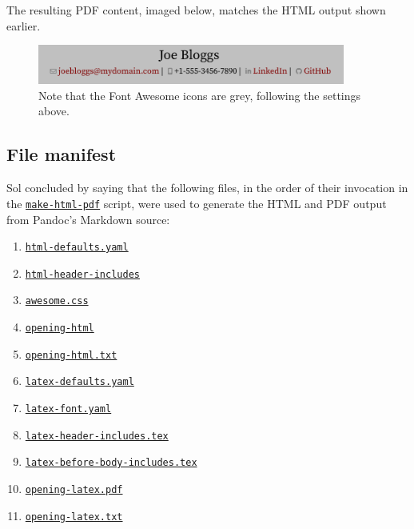 \documentclass[
  british,
  a4paper,
  rgb,
  dvipsnames,
  svgnames,
  hyphens]{article}
\providecommand{\tightlist}{%
  \setlength{\itemsep}{0pt}\setlength{\parskip}{0pt}}
\begin{document}
The resulting PDF content, imaged below, matches the HTML output shown
earlier.

\begin{figure}
\centering
\includegraphics[width=0.9\textwidth,height=\textheight]{images/opening-pdf.png}
\caption{Note that the Font Awesome icons are grey, following the
settings above.}
\end{figure}

\hypertarget{file-manifest}{%
\subsection{File manifest}\label{file-manifest}}

Sol concluded by saying that the following files, in the order of their
invocation in the \href{auxiliary/make-html-pdf}{\texttt{make-html-pdf}}
script, were used to generate the HTML and PDF output from Pandoc's
Markdown source:

\begin{enumerate}
\tightlist
\item
  \href{auxiliary/html-defaults.yaml}{\texttt{html-defaults.yaml}}
\item
  \href{auxiliary/html-header-includes}{\texttt{html-header-includes}}
\item
  \href{auxiliary/awesome.css}{\texttt{awesome.css}}
\item
  \href{auxiliary/opening-html}{\texttt{opening-html}}
\item
  \href{auxiliary/opening-html.txt}{\texttt{opening-html.txt}}
\item
  \href{auxiliary/latex-defaults.yaml}{\texttt{latex-defaults.yaml}}
\item
  \href{auxiliary/latex-font.yaml}{\texttt{latex-font.yaml}}
\item
  \href{auxiliary/latex-header-includes.tex}{\texttt{latex-header-includes.tex}}
\item
  \href{auxiliary/latex-before-body-includes.tex}{\texttt{latex-before-body-includes.tex}}
\item
  \href{auxiliary/opening-latex.pdf}{\texttt{opening-latex.pdf}}
\item
  \href{auxiliary/opening-latex.txt}{\texttt{opening-latex.txt}}
\end{enumerate}
\end{document}
